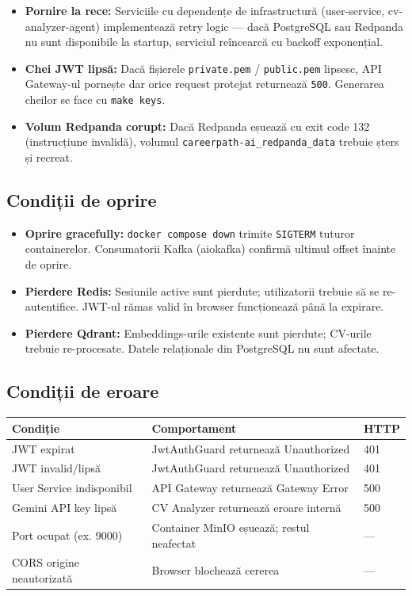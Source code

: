 \documentclass[12pt, a4paper]{report}
\begin{document}
\begin{itemize}[leftmargin=*]
  \item \textbf{Pornire la rece:} Serviciile cu dependențe de infrastructură
        (user-service, cv-analyzer-agent) implementează retry logic — dacă PostgreSQL
        sau Redpanda nu sunt disponibile la startup, serviciul reîncearcă cu backoff
        exponențial.
  \item \textbf{Chei JWT lipsă:} Dacă fișierele \texttt{private.pem} / \texttt{public.pem}
        lipsesc, API Gateway-ul pornește dar orice request protejat returnează \texttt{500}.
        Generarea cheilor se face cu \texttt{make keys}.
  \item \textbf{Volum Redpanda corupt:} Dacă Redpanda eșuează cu exit code 132
        (instrucțiune invalidă), volumul \texttt{careerpath-ai\_redpanda\_data} trebuie
        șters și recreat.
\end{itemize}

\subsection{Condiții de oprire}

\begin{itemize}[leftmargin=*]
  \item \textbf{Oprire gracefully:} \texttt{docker compose down} trimite \texttt{SIGTERM}
        tuturor containerelor. Consumatorii Kafka (aiokafka) confirmă ultimul offset
        înainte de oprire.
  \item \textbf{Pierdere Redis:} Sesiunile active sunt pierdute; utilizatorii trebuie
        să se re-autentifice. JWT-ul rămas valid în browser funcționează până la expirare.
  \item \textbf{Pierdere Qdrant:} Embeddings-urile existente sunt pierdute; CV-urile
        trebuie re-procesate. Datele relaționale din PostgreSQL nu sunt afectate.
\end{itemize}

\subsection{Condiții de eroare}

\begin{center}
\begin{tabularx}{\textwidth}{lXl}
\toprule
\rowcolor{primary!15}
\textbf{Condiție} & \textbf{Comportament} & \textbf{HTTP} \\
\midrule
JWT expirat & JwtAuthGuard returnează Unauthorized & 401 \\
JWT invalid/lipsă & JwtAuthGuard returnează Unauthorized & 401 \\
User Service indisponibil & API Gateway returnează Gateway Error & 500 \\
Gemini API key lipsă & CV Analyzer returnează eroare internă & 500 \\
Port ocupat (ex. 9000) & Container MinIO eșuează; restul neafectat & — \\
CORS origine neautorizată & Browser blochează cererea & — \\
\bottomrule
\end{tabularx}
\end{center}
\end{document}
